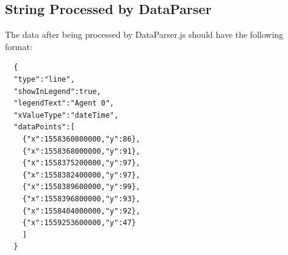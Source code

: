 \documentclass{article}
\begin{document}
\subsection{String Processed by DataParser} The data after being processed by DataParser.js should have the following format:
\begin{lstlisting}
  {
  "type":"line",
  "showInLegend":true,
  "legendText":"Agent 0",
  "xValueType":"dateTime",
  "dataPoints":[
    {"x":1558360800000,"y":86},
    {"x":1558368000000,"y":91},
    {"x":1558375200000,"y":97},
    {"x":1558382400000,"y":97},
    {"x":1558389600000,"y":99},
    {"x":1558396800000,"y":93},
    {"x":1558404000000,"y":92},
    {"x":1559253600000,"y":47}
    ]
  }
\end{lstlisting}
\end{document}
